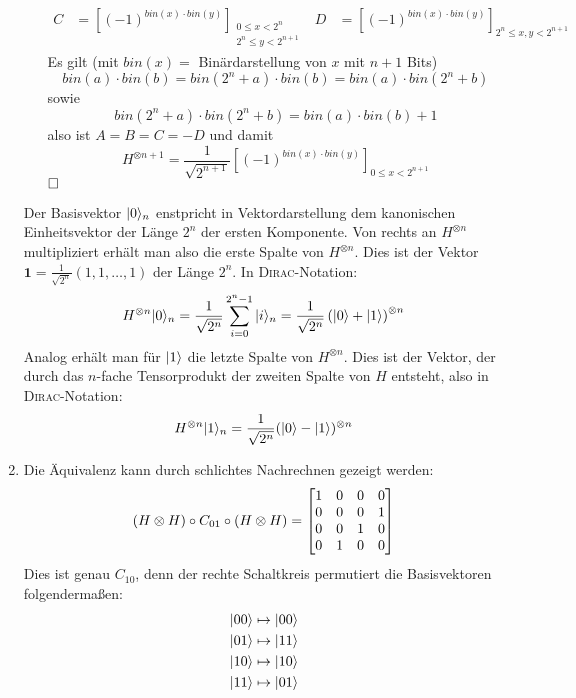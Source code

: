\begin{enumerate}
\begin{itemize}
\begin{align*}
                C &= \left[(-1)^{bin(x)\cdot bin(y)}\right]_{\substack{0   \leq x < 2^n \\
                                                                              2^n \leq y < 2^{n+1}}} &
                D &= \left[(-1)^{bin(x)\cdot bin(y)}\right]_{2^n \leq x,y < 2^{n+1}}
                \end{align*}
                Es gilt (mit $bin(x) = $ Binärdarstellung von $x$ mit $n+1$ Bits)
                \[ bin(a)\cdot bin(b) = bin(2^n + a)\cdot bin(b) = bin(a)\cdot bin(2^n + b) \]
                sowie
                \[ bin(2^n + a)\cdot bin(2^n + b) = bin(a)\cdot bin(b) + 1 \]
                also ist $A = B = C = -D$ und damit
                \[ H^{\otimes n+1} = \frac{1}{\sqrt{2^{n+1}}} \left[(-1)^{bin(x)\cdot bin(y)}\right]_{0 \leq x < 2^{n+1}} \]$\hfill\square$
        \end{itemize}
        Der Basisvektor $| 0 \rangle_n$ enstpricht in Vektordarstellung dem
        kanonischen Einheitsvektor der Länge $2^n$ der ersten Komponente. Von rechts an
        $H^{\otimes n}$ multipliziert erhält man also die erste Spalte von $H^{\otimes n}$.
        Dies ist der Vektor $\mathbf{1} = \frac{1}{\sqrt{2^n}} (1, 1, \dots, 1)$ der Länge $2^n$. In \textsc{Dirac}-Notation:
        \[ H^{\otimes n} | 0 \rangle_n = \frac{1}{\sqrt{2^n}} \sum_{i=0}^{2^n-1} | i \rangle_n = \frac{1}{\sqrt{2^n}} \left(| 0 \rangle + | 1 \rangle\right)^{\otimes n} \]
        Analog erhält man für $| 1 \rangle$ die letzte Spalte von $H^{\otimes n}$.
        Dies ist der Vektor, der durch das $n$-fache Tensorprodukt der zweiten Spalte
        von $H$ entsteht, also in \textsc{Dirac}-Notation:
        \[ H^{\otimes n} | 1 \rangle_n = \frac{1}{\sqrt{2^n}} (| 0 \rangle - | 1 \rangle)^{\otimes n} \]
\item Die Äquivalenz kann durch schlichtes Nachrechnen gezeigt werden:
        \[ (H \otimes H) \circ C_{01} \circ (H \otimes H) = \begin{bmatrix}1&0&0&0\\0&0&0&1\\0&0&1&0\\0&1&0&0\end{bmatrix} \]
       Dies ist genau $C_{10}$, denn der rechte Schaltkreis permutiert die
       Basisvektoren folgendermaßen:
       \begin{eqnarray*}
               | 00 \rangle \mapsto | 00 \rangle \\
               | 01 \rangle \mapsto | 11 \rangle \\
               | 10 \rangle \mapsto | 10 \rangle \\
               | 11 \rangle \mapsto | 01 \rangle
       \end{eqnarray*}
\end{enumerate}
